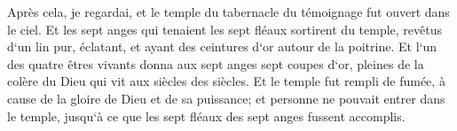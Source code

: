 \verse Après cela, je regardai, et le temple du tabernacle du témoignage fut ouvert dans le ciel. 
\verse Et les sept anges qui tenaient les sept fléaux sortirent du temple, revêtus d`un lin pur, éclatant, et ayant des ceintures d`or autour de la poitrine. 
\verse Et l`un des quatre êtres vivants donna aux sept anges sept coupes d`or, pleines de la colère du Dieu qui vit aux siècles des siècles. 
\verse Et le temple fut rempli de fumée, à cause de la gloire de Dieu et de sa puissance; et personne ne pouvait entrer dans le temple, jusqu`à ce que les sept fléaux des sept anges fussent accomplis. 

\chapter{}

